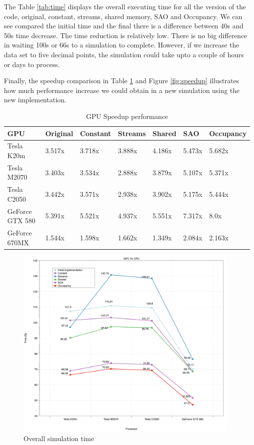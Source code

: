   The Table \ref{tab:time} displays the overall executing time for all the version of the code, original, constant, streams, shared memory, SAO and Occupancy. We can see compared the initial time and the final there is a difference between 40s and 50s time decrease. The time reduction is relatively low. There is no big difference in waiting 100s or 66s to a simulation to complete. However, if we increase the data set to five decimal points, the simulation could take upto a couple of hours or days to process. 
  
  Finally, the speedup comparison in Table \ref{tab:speed} and Figure \ref{fig:speedup} illustrates how much performance increase we could obtain in a new simulation using the new implementation.
  
  \begin{table}[h]
\centering
  \begin{tabular} { |  l  |  l | l  |  l  | l | l | l |}
    \hline
    GPU & Original & Constant & Streams & Shared & SAO & Occupancy\\
    \hline
    Tesla K20m & 3.517x & 3.718x & 3.888x & 4.186x & 5.473x & 5.682x\\
   \hline
    Tesla M2070 & 3.403x & 3.534x & 2.888x & 3.879x & 5.107x & 5.371x\\
    \hline
    Tesla C2050 & 3.442x & 3.571x & 2.938x & 3.902x & 5.175x & 5.444x\\
   \hline
    GeForce GTX 580 & 5.391x & 5.521x & 4.937x & 5.551x & 7.317x & 8.0x\\
   \hline
    GeForce 670MX & 1.544x & 1.598x & 1.662x & 1.349x & 2.084x & 2.163x\\
   \hline
  \end{tabular}
    \caption{GPU Speedup performance}
  \label{tab:speed}
  \end{table}

\begin{figure}[htbp]
	\centering
		\includegraphics[width=0.98\textwidth]{Figures/gpuOptimization.png}
		\smallskip
	\caption[Overall simulation time]{Overall simulation time}
	\label{fig:gpuop}
\end{figure}


